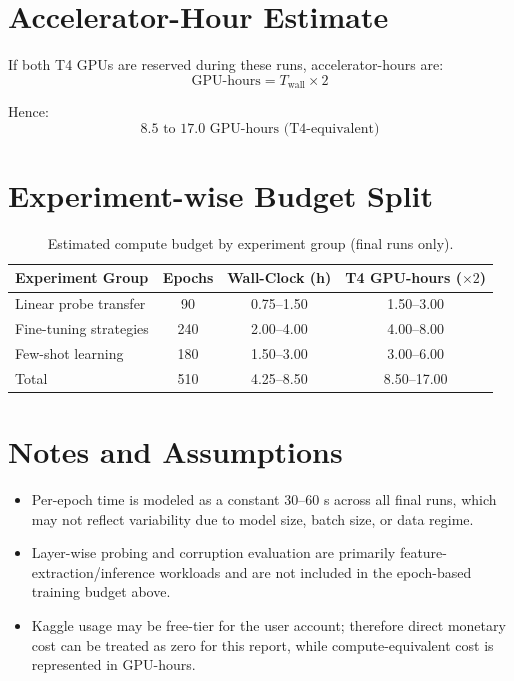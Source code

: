 \documentclass[11pt,a4paper]{article}
\begin{document}
\section{Accelerator-Hour Estimate}
If both T4 GPUs are reserved during these runs, accelerator-hours are:
\[
\text{GPU-hours} = T_{\text{wall}} \times 2
\]

Hence:
\[
\boxed{8.5\text{ to }17.0\text{ GPU-hours (T4-equivalent)}}
\]

\section{Experiment-wise Budget Split}
\begin{table}[h!]
\centering
\caption{Estimated compute budget by experiment group (final runs only).}
\begin{tabular}{lccc}
\toprule
Experiment Group & Epochs & Wall-Clock (h) & T4 GPU-hours ($\times 2$) \\
\midrule
Linear probe transfer & 90  & 0.75--1.50 & 1.50--3.00 \\
Fine-tuning strategies & 240 & 2.00--4.00 & 4.00--8.00 \\
Few-shot learning & 180 & 1.50--3.00 & 3.00--6.00 \\
\midrule
Total & 510 & 4.25--8.50 & 8.50--17.00 \\
\bottomrule
\end{tabular}
\end{table}

\section{Notes and Assumptions}
\begin{itemize}
    \item Per-epoch time is modeled as a constant 30--60 s across all final runs, which may not reflect variability due to model size, batch size, or data regime.
    \item Layer-wise probing and corruption evaluation are primarily feature-extraction/inference workloads and are not included in the epoch-based training budget above.
    \item Kaggle usage may be free-tier for the user account; therefore direct monetary cost can be treated as zero for this report, while compute-equivalent cost is represented in GPU-hours.
\end{itemize}
\end{document}
